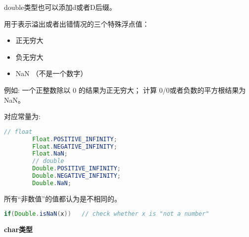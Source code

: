 double类型也可以添加d或者D后缀。


用于表示溢出或者出错情况的三个特殊浮点值：

\begin{itemize}
        \item   正无穷大  
        \item   负无穷大
        \item   NaN （不是一个数字）
\end{itemize}

例如: 一个正整数除以 0 的结果为正无穷大； 计算 0/0或者负数的平方根结果为NaN。

对应常量为:
\begin{lstlisting}[language=java]
        // float
        Float.POSITIVE_INFINITY;
        Float.NEGATIVE_INFINITY;
        Float.NaN;
        // double
        Double.POSITIVE_INFINITY;
        Double.NEGATIVE_INFINITY;
        Double.NaN;
\end{lstlisting}


所有“非数值”的值都认为是不相同的。

\begin{lstlisting}[language=java]
        if(Double.isNaN(x))   // check whether x is "not a number"
\end{lstlisting}




\textbf{char类型}



































